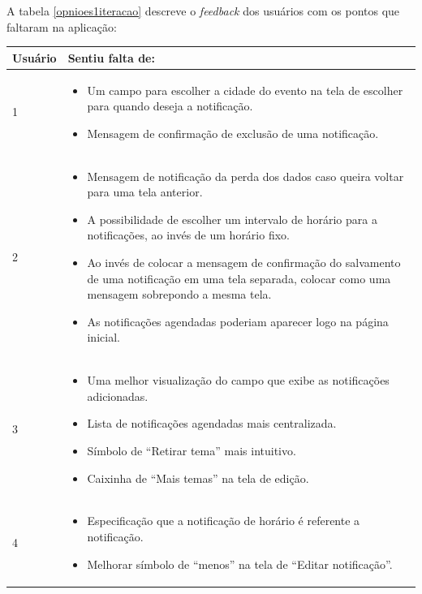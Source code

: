   A tabela \ref{opnioes1iteracao} descreve o \textit{feedback} dos usuários com os pontos que faltaram na aplicação:
	
  \begin{table}[h]
  \centering
  \begin{tabular}{|m{1.5cm}||m{15cm}|}
    \hline
    \textbf{Usuário} & \textbf{Sentiu falta de:}\\
    
    \hline                               
    1 & 
      \begin{itemize}
	\item Um campo para escolher a cidade do evento na tela de escolher para quando deseja a notificação.
	\item Mensagem de confirmação de exclusão de uma notificação.
      \end{itemize}\\

    \hline                               
    2 & 
      \begin{itemize}
	\item Mensagem de notificação da perda dos dados caso queira voltar para uma tela anterior.
	\item A possibilidade de escolher um intervalo de horário para a notificações, ao invés de um horário fixo.
	\item Ao invés de colocar a mensagem de confirmação do salvamento de uma notificação em uma tela separada, colocar como uma mensagem sobrepondo a mesma tela.
	\item As notificações agendadas poderiam aparecer logo na página inicial.
      \end{itemize}\\
    
    \hline                               
    3 & 
      \begin{itemize}
	\item Uma melhor visualização do campo que exibe as notificações adicionadas.
	\item Lista de notificações agendadas mais centralizada.
	\item Símbolo de “Retirar tema” mais intuitivo.
	\item Caixinha de “Mais temas” na tela de edição.
      \end{itemize}\\
    
    \hline                               
    4 & 
    \begin{itemize}
      \item Especificação que a notificação de horário é referente a notificação.
      \item Melhorar símbolo de “menos” na tela de “Editar notificação”.
    \end{itemize}\\
    

\end{tabular}
\end{table}
